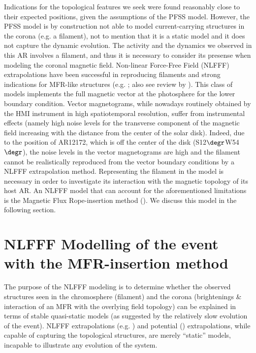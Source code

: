 \documentclass[preprint]{aastex}
\begin{document}
Indications for the topological features we seek were found reasonably close to their expected positions, given the assumptions of the PFSS model. However, the PFSS model is by construction not able to model current-carrying structures in the corona (e.g. a filament), not to mention that it is a static model and it does not capture the dynamic evolution. The activity and the dynamics we observed in this AR involves a filament, and thus it is necessary to consider its presense when modeling the coronal magnetic field. Non-linear Force-Free Field (NLFFF) extrapolations have been successful in reproducing filaments and strong indications for MFR-like structures (e.g. \citealt{Chintzoglou_etal_2015}; also see review by \citealt{Wiegelmann_Sakurai_2012}). This class of models implements the full magnetic vector at the photosphere for the lower boundary condition. Vector magnetograms, while nowadays routinely obtained by the HMI instrument in high spatiotemporal resolution, suffer from instrumental effects (namely high noise levels for the transverse component of the magnetic field increasing with the distance from the center of the solar disk). Indeed, due to the position of AR12172, which is off the center of the disk (S12$\degr$W54$\degr$), the noise levels in the vector magnetograms are high and the filament cannot be realistically reproduced from the vector boundary conditions by a NLFFF extrapolation method. Representing the filament in the model is necessary in order to investigate its interaction with the magnetic topology of its host AR. An NLFFF model that can account for the aforementioned limitations is the Magnetic Flux Rope-insertion method (\citealt{vanBallegooijen_2004}). We discuss this model in the following section.

\section{NLFFF Modelling of the event with the MFR-insertion method}

The purpose of the NLFFF modeling is to determine whether the observed structures seen in the chromosphere (filament) and the corona (brightenings \& interaction of an MFR with the overlying field topology) can be explained in terms of stable quasi-static models (as suggested by the relatively slow evolution of the event). NLFFF extrapolations (e.g. \citealt{Wiegelmann_2004}) and potential (\citealt{Schmidt_1964}) extrapolations, while capable of capturing the topological structures, are merely ``static'' models, incapable to illustrate any evolution of the system.
\end{document}
